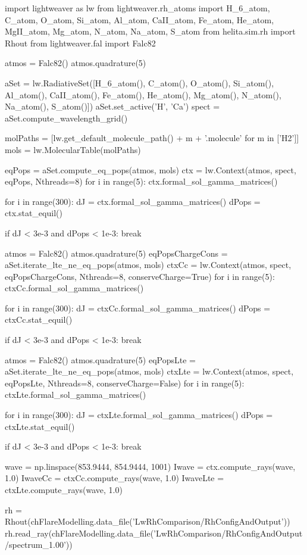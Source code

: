 \begin{pycode}[FlareModelling]
import lightweaver as lw
from lightweaver.rh_atoms import H_6_atom, C_atom, O_atom,  Si_atom, Al_atom, CaII_atom, Fe_atom, He_atom, MgII_atom, Mg_atom, N_atom, Na_atom, S_atom
from helita.sim.rh import Rhout
from lightweaver.fal import Falc82

atmos = Falc82()
atmos.quadrature(5)

aSet = lw.RadiativeSet([H_6_atom(), C_atom(), O_atom(), Si_atom(), Al_atom(),
                        CaII_atom(), Fe_atom(), He_atom(), Mg_atom(), N_atom(),
                        Na_atom(), S_atom()])
aSet.set_active('H', 'Ca')
spect = aSet.compute_wavelength_grid()

molPaths = [lw.get_default_molecule_path() + m + '.molecule' for m in ['H2']]
mols = lw.MolecularTable(molPaths)

eqPops = aSet.compute_eq_pops(atmos, mols)
ctx = lw.Context(atmos, spect, eqPops, Nthreads=8)
for i in range(5):
    ctx.formal_sol_gamma_matrices()

for i in range(300):
    dJ = ctx.formal_sol_gamma_matrices()
    dPops = ctx.stat_equil()

    if dJ < 3e-3 and dPops < 1e-3:
        break

atmos = Falc82()
atmos.quadrature(5)
eqPopsChargeCons = aSet.iterate_lte_ne_eq_pops(atmos, mols)
ctxCc = lw.Context(atmos, spect, eqPopsChargeCons, Nthreads=8, conserveCharge=True)
for i in range(5):
    ctxCc.formal_sol_gamma_matrices()

for i in range(300):
    dJ = ctxCc.formal_sol_gamma_matrices()
    dPops = ctxCc.stat_equil()

    if dJ < 3e-3 and dPops < 1e-3:
        break

atmos = Falc82()
atmos.quadrature(5)
eqPopsLte = aSet.iterate_lte_ne_eq_pops(atmos, mols)
ctxLte = lw.Context(atmos, spect, eqPopsLte, Nthreads=8, conserveCharge=False)
for i in range(5):
    ctxLte.formal_sol_gamma_matrices()

for i in range(300):
    dJ = ctxLte.formal_sol_gamma_matrices()
    dPops = ctxLte.stat_equil()

    if dJ < 3e-3 and dPops < 1e-3:
        break

wave = np.linspace(853.9444, 854.9444, 1001)
Iwave = ctx.compute_rays(wave, 1.0)
IwaveCc = ctxCc.compute_rays(wave, 1.0)
IwaveLte = ctxLte.compute_rays(wave, 1.0)

rh = Rhout(chFlareModelling.data_file('LwRhComparison/RhConfigAndOutput'))
rh.read_ray(chFlareModelling.data_file('LwRhComparison/RhConfigAndOutput/spectrum_1.00'))


\end{pycode}
